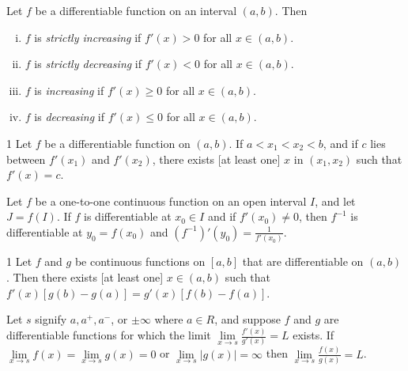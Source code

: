 \begin{theo}{1}
	Let $f$ be a differentiable function on an interval $(a, b)$. Then
	\begin{enumerate}[(i)]
		\item $f$ is \textit{strictly increasing} if $f'(x) > 0$ for all $x \in (a, b)$.
		\item $f$ is \textit{strictly decreasing} if $f'(x)< 0$ for all $x \in (a, b)$.
		\item $f$ is \textit{increasing} if $f'(x) \geq 0$ for all $x \in (a, b)$.
		\item $f$ is \textit{decreasing} if $f'(x) \leq 0$ for all $x \in (a, b)$.
	\end{enumerate}
\end{theo}

\begin{theo}{1}
	Let $f$ be a differentiable function on $(a, b)$. If $a < x_1 < x_2 < b$, and	if $c$ lies between $f'(x_1)$ and $f'(x_2)$, there exists [at least one] $x$ in $(x_1 , x_2)$ such that $f'(x) = c$.
\end{theo}

\begin{theo}{1}
	Let $f$ be a one-to-one continuous function on an open interval $I$, and	let $J = f (I)$. If $f$ is differentiable at $x_0 \in I$ and if $f'(x_0) \neq 0$, then $f^{−1}$ is differentiable at $y_0 = f(x_0)$ and	$(f^{-1})'(y_0) = \frac{1}{f'(x_0)}$.
\end{theo}

\begin{theo}{1}
	Let $f$ and $g$ be continuous functions on $[a, b]$ that are differentiable on $(a, b)$. Then there exists [at least one] $x \in (a, b)$ such that $f'(x)[g(b) - g(a)] = g'(x)[f (b) - f (a)]$.
\end{theo}

\begin{defn}{1}
	Let $s$ signify $a, a^+ , a^-$, or $\pm \infty$ where $a\in R$, and suppose $f$ and	$g$ are differentiable functions for which the limit $\lim\limits_{x\rightarrow s}\frac{f'(x)}{g'(x)}=L$ exists. If $\lim\limits_{x\rightarrow s} f(x) = \lim\limits_{x\rightarrow s} g(x)=0$ or $\lim\limits_{x\rightarrow s} |g(x)| = \infty$ then $\lim\limits_{x\rightarrow s}\frac{f(x)}{g(x)}=L$.
\end{defn}

